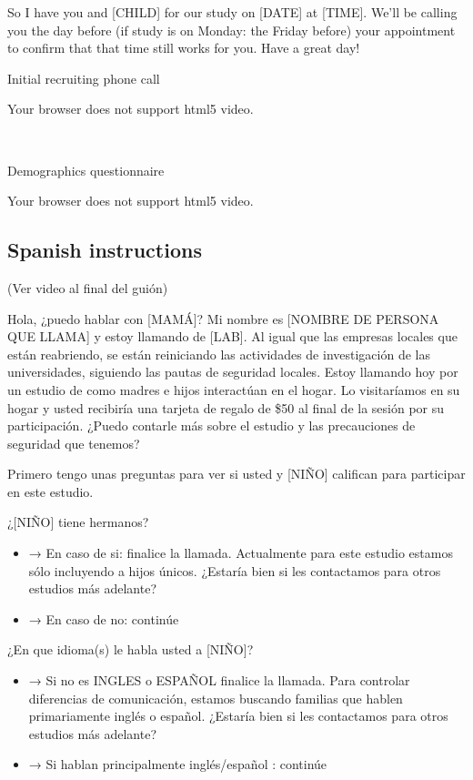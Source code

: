 \documentclass[
]{book}
\providecommand{\tightlist}{%
  \setlength{\itemsep}{0pt}\setlength{\parskip}{0pt}}
\begin{document}
So I have you and {[}CHILD{]} for our study on {[}DATE{]} at {[}TIME{]}. We'll be calling you the day before (if study is on Monday: the Friday before) your appointment to confirm that that time still works for you. Have a great day!

Initial recruiting phone call

Your browser does not support html5 video.

 

Demographics questionnaire

Your browser does not support html5 video.

\hypertarget{spanish_instructions}{%
\subsection*{Spanish instructions}\label{spanish_instructions}}

(Ver video al final del guión)

Hola, ¿puedo hablar con {[}MAMÁ{]}?
Mi nombre es {[}NOMBRE DE PERSONA QUE LLAMA{]} y estoy llamando de {[}LAB{]}. Al igual que las empresas locales que están reabriendo, se están reiniciando las actividades de investigación de las universidades, siguiendo las pautas de seguridad locales. Estoy llamando hoy por un estudio de como madres e hijos interactúan en el hogar. Lo visitaríamos en su hogar y usted recibiría una tarjeta de regalo de \$50 al final de la sesión por su participación. ¿Puedo contarle más sobre el estudio y las precauciones de seguridad que tenemos?

Primero tengo unas preguntas para ver si usted y {[}NIÑO{]} califican para participar en este estudio.

¿{[}NIÑO{]} tiene hermanos?

\begin{itemize}
\tightlist
\item
  → En caso de si: finalice la llamada. Actualmente para este estudio estamos sólo incluyendo a hijos únicos. ¿Estaría bien si les contactamos para otros estudios más adelante?
\item
  → En caso de no: continúe
\end{itemize}

¿En que idioma(s) le habla usted a {[}NIÑO{]}?

\begin{itemize}
\tightlist
\item
  → Si no es INGLES o ESPAÑOL finalice la llamada. Para controlar diferencias de comunicación, estamos buscando familias que hablen primariamente inglés o español. ¿Estaría bien si les contactamos para otros estudios más adelante?
\item
  → Si hablan principalmente inglés/español : continúe
\end{itemize}
\end{document}
